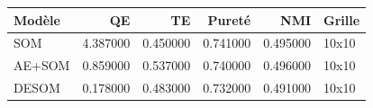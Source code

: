\begin{tabular}{lrrrrl}
\toprule
Modèle & QE & TE & Pureté & NMI & Grille \\
\midrule
SOM & 4.387000 & 0.450000 & 0.741000 & 0.495000 & 10x10 \\
AE+SOM & 0.859000 & 0.537000 & 0.740000 & 0.496000 & 10x10 \\
DESOM & 0.178000 & 0.483000 & 0.732000 & 0.491000 & 10x10 \\
\bottomrule
\end{tabular}
